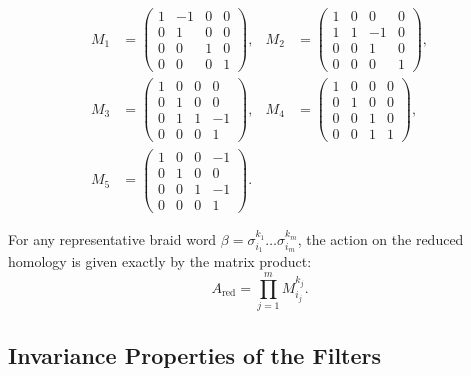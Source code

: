 \begin{align}
M_1 &= \begin{pmatrix} 1 & -1 & 0 & 0 \\ 0 & 1 & 0 & 0 \\ 0 & 0 & 1 & 0 \\ 0 & 0 & 0 & 1 \end{pmatrix}, &
M_2 &= \begin{pmatrix} 1 & 0 & 0 & 0 \\ 1 & 1 & -1 & 0 \\ 0 & 0 & 1 & 0 \\ 0 & 0 & 0 & 1 \end{pmatrix}, \\
M_3 &= \begin{pmatrix} 1 & 0 & 0 & 0 \\ 0 & 1 & 0 & 0 \\ 0 & 1 & 1 & -1 \\ 0 & 0 & 0 & 1 \end{pmatrix}, &
M_4 &= \begin{pmatrix} 1 & 0 & 0 & 0 \\ 0 & 1 & 0 & 0 \\ 0 & 0 & 1 & 0 \\ 0 & 0 & 1 & 1 \end{pmatrix}, \\
M_5 &= \begin{pmatrix} 1 & 0 & 0 & -1 \\ 0 & 1 & 0 & 0 \\ 0 & 0 & 1 & -1 \\ 0 & 0 & 0 & 1 \end{pmatrix}.
\end{align}

For any representative braid word $\beta = \sigma_{i_1}^{k_1} \dots \sigma_{i_m}^{k_m}$, the action on the reduced homology is given exactly by the matrix product:
\begin{equation}
    A_{\text{red}} = \prod_{j=1}^m M_{i_j}^{k_j}.
\end{equation}

\subsection{Invariance Properties of the Filters}
\label{subsec:filter_invariance}

